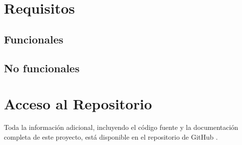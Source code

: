 \documentclass{article}
\begin{document}
\section{Requisitos}

\subsection{Funcionales}

\subsection{No funcionales}




\section{Acceso al Repositorio}

Toda la información adicional, incluyendo el código fuente y la documentación completa de este proyecto, está disponible en el repositorio de GitHub .

\end{document}
